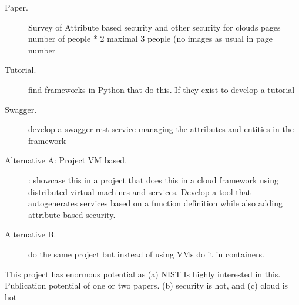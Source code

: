 \begin{description} 

\item[Paper.] Survey of Attribute based security and other  security for clouds pages = number of people * 2  maximal 3 people (no images as usual in page number
 
\item [Tutorial.] find frameworks in Python that do this. If they
  exist to develop a tutorial
 
\item[Swagger.] develop a swagger rest service managing the attributes
  and entities in the framework
 
\item[Alternative A: Project VM based.]: showcase this in a project
  that does this in a cloud framework using distributed virtual
  machines and services. Develop a tool that autogenerates services
  based on a function definition while also adding attribute based
  security.
 
\item[Alternative B.] do the same project but instead of using VMs do it in containers.
 
\end{description}

This project has enormous potential as (a) NIST Is highly interested
in this. Publication potential of one or two papers. (b) security is
hot, and (c) cloud is hot
 

